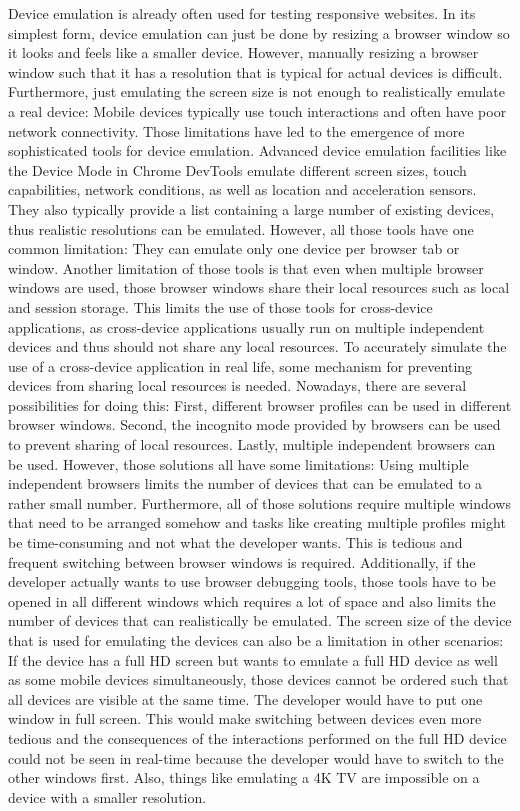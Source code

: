 Device emulation is already often used for testing responsive websites. In its simplest form, device emulation can just be done by resizing a browser window so it looks and feels like a smaller device. However, manually resizing a browser window such that it has a resolution that is typical for actual devices is difficult. Furthermore, just emulating the screen size is not enough to realistically emulate a real device: Mobile devices typically use touch interactions and often have poor network connectivity. Those limitations have led to the emergence of more sophisticated tools for device emulation. Advanced device emulation facilities like the Device Mode in Chrome DevTools emulate different screen sizes, touch capabilities, network conditions, as well as location and acceleration sensors. They also typically provide a list containing a large number of existing devices, thus realistic resolutions can be emulated. However, all those tools have one common limitation: They can emulate only one device per browser tab or window. Another limitation of those tools is that even when multiple browser windows are used, those browser windows share their local resources such as local and session storage. This limits the use of those tools for cross-device applications, as cross-device applications usually run on multiple independent devices and thus should not share any local resources. To accurately simulate the use of a cross-device application in real life, some mechanism for preventing devices from sharing local resources is needed. Nowadays, there are several possibilities for doing this: First, different browser profiles can be used in different browser windows. Second, the incognito mode provided by browsers can be used to prevent sharing of local resources. Lastly, multiple independent browsers can be used. However, those solutions all have some limitations: Using multiple independent browsers limits the number of devices that can be emulated to a rather small number. Furthermore, all of those solutions require multiple windows that need to be arranged somehow and tasks like creating multiple profiles might be time-consuming and not what the developer wants. This is tedious and frequent switching between browser windows is required. Additionally, if the developer actually wants to use browser debugging tools, those tools have to be opened in all different windows which requires a lot of space and also limits the number of devices that can realistically be emulated. The screen size of the device that is used for emulating the devices can also be a limitation in other scenarios: If the device has a full HD screen but wants to emulate a full HD device as well as some mobile devices simultaneously, those devices cannot be ordered such that all devices are visible at the same time. The developer would have to put one window in full screen. This would make switching between devices even more tedious and the consequences of the interactions performed on the full HD device could not be seen in real-time because the developer would have to switch to the other windows first. Also, things like emulating a 4K TV are impossible on a device with a smaller resolution. 

